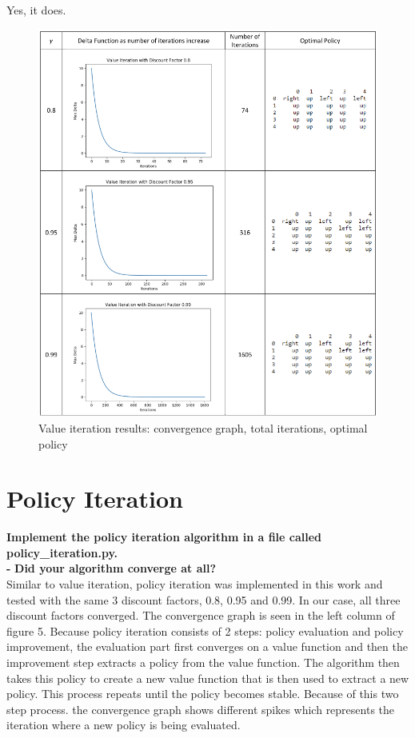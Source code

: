 \documentclass[11pt]{article}
\begin{document}
\noindent
Yes, it does.
\\

\newpage
\begin{figure}[h]
\includegraphics[scale=0.5]{VI_chart}
\centering
\caption{Value iteration results: convergence graph, total iterations, optimal policy}
\end{figure}


\newpage
\section{Policy Iteration}
\textbf{Implement the policy iteration algorithm in a file called
policy\_iteration.py.}
\\

\noindent
\textbf{-}
\noindent
\textbf{Did your algorithm converge at all?}
\\

\noindent
Similar to value iteration, policy iteration was implemented in this work and
tested with the same 3 discount factors, 0.8, 0.95 and 0.99. In our case, all
three discount factors converged. The convergence graph is seen in the left
column of figure 5. Because policy iteration consists of 2 steps: policy
evaluation and policy improvement, the evaluation part first converges on a
value function and then the improvement step extracts a policy from the value
function. The algorithm then takes this policy to create a new value function
that is then used to extract a new policy. This process repeats until the policy
becomes stable. Because of this two step process. the convergence graph shows
different spikes which represents the iteration where a new policy is being
evaluated.
\\
\end{document}
